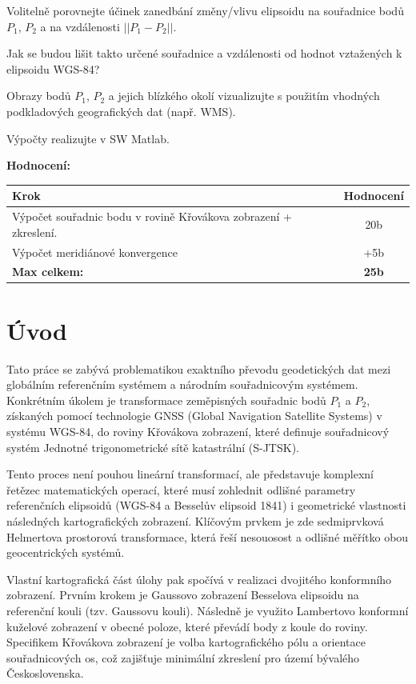 \documentclass[12pt, a4paper]{article}
\begin{document}
Volitelně porovnejte účinek zanedbání změny/vlivu elipsoidu na souřadnice bodů $P_{1}$, $P_{2}$ a na vzdálenosti $||P_{1}-P_{2}||$.

Jak se budou lišit takto určené souřadnice a vzdálenosti od hodnot vztažených k elipsoidu WGS-84?

Obrazy bodů $P_{1}$, $P_{2}$ a jejich blízkého okolí vizualizujte s použitím vhodných podkladových geografických dat (např. WMS).

Výpočty realizujte v SW Matlab.

\vspace{1.5em}
\noindent\textbf{Hodnocení:}
\vspace{1em}

\begin{center}
\begin{tabular}{|p{12.5cm}|c|}
\hline
\textbf{Krok} & \textbf{Hodnocení} \\ \hline\hline
Výpočet souřadnic bodu v rovině Křovákova zobrazení + zkreslení. & 20b \\ \hline
Výpočet meridiánové konvergence & +5b \\ \hline
\textbf{Max celkem:} & \textbf{25b} \\ \hline
\end{tabular}
\end{center}

\clearpage
\newpage

\section{Úvod}
Tato práce se zabývá problematikou exaktního převodu geodetických dat mezi globálním referenčním systémem a národním souřadnicovým systémem. Konkrétním úkolem je transformace zeměpisných souřadnic bodů $P_1$ a $P_2$, získaných pomocí technologie GNSS (Global Navigation Satellite Systems) v systému WGS-84, do roviny Křovákova zobrazení, které definuje souřadnicový systém Jednotné trigonometrické sítě katastrální (S-JTSK).

Tento proces není pouhou lineární transformací, ale představuje komplexní řetězec matematických operací, které musí zohlednit odlišné parametry referenčních elipsoidů (WGS-84 a Besselův elipsoid 1841) i geometrické vlastnosti následných kartografických zobrazení. Klíčovým prvkem je zde sedmiprvková Helmertova prostorová transformace, která řeší nesouosost a odlišné měřítko obou geocentrických systémů.

Vlastní kartografická část úlohy pak spočívá v realizaci dvojitého konformního zobrazení. Prvním krokem je Gaussovo zobrazení Besselova elipsoidu na referenční kouli (tzv. Gaussovu kouli). Následně je využito Lambertovo konformní kuželové zobrazení v obecné poloze, které převádí body z koule do roviny. Specifikem Křovákova zobrazení je volba kartografického pólu a orientace souřadnicových os, což zajišťuje minimální zkreslení pro území bývalého Československa.
\end{document}
